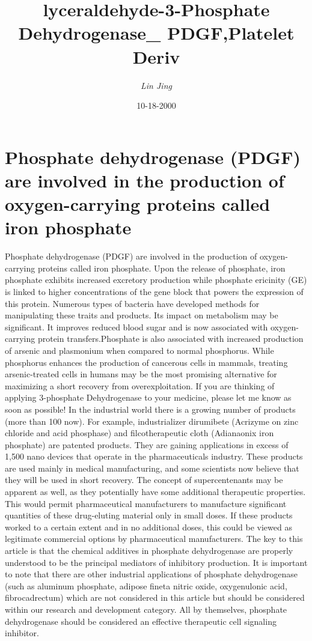 \documentclass{article}%
\title{lyceraldehyde{-}3{-}Phosphate Dehydrogenase\_ PDGF,Platelet Deriv}%
\author{\textit{Lin Jing}}%
\date{10-18-2000}%
\begin{document}
%
\normalsize%
\maketitle%
\section{Phosphate dehydrogenase (PDGF) are involved in the production of oxygen{-}carrying proteins called iron phosphate}%
\label{sec:Phosphatedehydrogenase(PDGF)areinvolvedintheproductionofoxygen{-}carryingproteinscalledironphosphate}%
Phosphate dehydrogenase (PDGF) are involved in the production of oxygen{-}carrying proteins called iron phosphate. Upon the release of phosphate, iron phosphate exhibits increased excretory production while phosphate ericinity (GE) is linked to higher concentrations of the gene block that powers the expression of this protein. Numerous types of bacteria have developed methods for manipulating these traits and products. Its impact on metabolism may be significant. It improves reduced blood sugar and is now associated with oxygen{-}carrying protein transfers.Phosphate is also associated with increased production of arsenic and plasmonium when compared to normal phosphorus. While phosphorus enhances the production of cancerous cells in mammals, treating arsenic{-}treated cells in humans may be the most promising alternative for maximizing a short recovery from overexploitation.\newline%
If you are thinking of applying 3{-}phosphate Dehydrogenase to your medicine, please let me know as soon as possible! In the industrial world there is a growing number of products (more than 100 now). For example, industrializer dirumibete (Acrizyme on zinc chloride and acid phosphase) and filcotherapeutic cloth (Adianaonix iron phosphate) are patented products. They are gaining applications in excess of 1,500 nano devices that operate in the pharmaceuticals industry. These products are used mainly in medical manufacturing, and some scientists now believe that they will be used in short recovery. The concept of supercentenants may be apparent as well, as they potentially have some additional therapeutic properties. This would permit pharmaceutical manufacturers to manufacture significant quantities of these drug{-}eluting material only in small doses. If these products worked to a certain extent and in no additional doses, this could be viewed as legitimate commercial options by pharmaceutical manufacturers. The key to this article is that the chemical additives in phosphate dehydrogenase are properly understood to be the principal mediators of inhibitory production. It is important to note that there are other industrial applications of phosphate dehydrogenase (such as aluminum phosphate, adipose fineta nitric oxide, oxygenulonic acid, fibrocadrectum) which are not considered in this article but should be considered within our research and development category. All by themselves, phosphate dehydrogenase should be considered an effective therapeutic cell signaling inhibitor.\newline%
\end{document}
